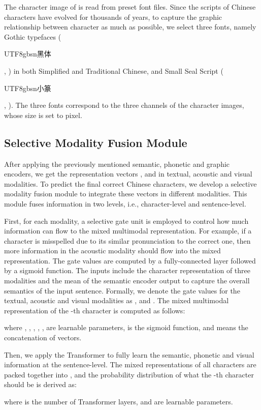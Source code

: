 \documentclass[11pt,a4paper]{article}
\newcommand{\cjksong}[1]{{{\begin{CJK*}{UTF8}{gbsn}#1\end{CJK*}}}}
\begin{document}
The character image of  is read from preset font files.
Since the scripts of Chinese characters have evolved for thousands of years, to capture the graphic relationship between character as much as possible, we select three fonts, namely Gothic typefaces (\cjksong{黑体}, ) in both Simplified and Traditional Chinese, and Small Seal Script (\cjksong{小篆}, ).
The three fonts correspond to the three channels of the character images, whose size is set to   pixel. 

\subsection{Selective Modality Fusion Module}

After applying the previously mentioned semantic, phonetic and graphic encoders, we get the representation vectors ,  and  in textual, acoustic and visual modalities.
To predict the final correct Chinese characters, we develop a selective modality fusion module to integrate these vectors in different modalities.
This module fuses information in two levels, i.e., character-level and sentence-level.

First, for each modality, a selective gate unit is employed to control how much information can flow to the mixed multimodal representation.
For example, if a character is misspelled due to its similar pronunciation to the correct one, then more information in the acoustic modality should flow into the mixed representation. 
The gate values are computed by a fully-connected layer followed by a sigmoid function.
The inputs include the character representation of three modalities and the mean of the semantic encoder output  to capture the overall semantics of the input sentence. 
Formally, we denote the gate values for the textual, acoustic and visual modalities as ,  and . The mixed multimodal representation  of the -th character is computed as follows: 

where , , , , ,  are learnable parameters,  is the sigmoid function, and  means the concatenation of vectors. 


Then, we apply the Transformer to fully learn the semantic, phonetic and visual information at the sentence-level.
The mixed representations of all characters are packed together into , and the probability distribution  of what the -th character should be is derived as:

where  is the number of Transformer layers,  and  are learnable parameters. 
\end{document}

